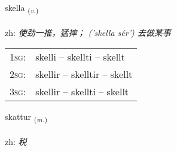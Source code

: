 \documentclass[frontgrid, backgrid]{flacards}\usepackage[]{graphicx}\usepackage[]{color}
\begin{document}
\renewcommand{\flhead}{\vskip5pt \fboxsep=0pt {\small\bfseries\footnotesize Sagnorð | 动词}}
\renewcommand{\fcfoot}{\vskip5pt \fboxsep=0pt \hspace{2pt}{\small\bfseries\footnotesize 2K}}

\renewcommand{\blhead}{\vskip5pt {\small\bfseries\footnotesize Sagnorð | 动词 }}
\renewcommand{\bcfoot}{\vskip5pt \hspace{2pt}{\small\bfseries\footnotesize 2K}}


{skella \small{\textsubscript{(\textit{v.})}} \\[1ex] %
\textphonetic{[scɛtla]} \\
zh: \emph{使劲一推，猛摔； ('skella sér') 去做某事} \\  [2ex]
\renewcommand*{\arraystretch}{0.8}
\begin{tabular}{p{1cm}l}
\textsc{1sg}: & skelli -- skellti -- skellt \\ 
\textsc{2sg}: & skellir -- skelltir -- skellt \\ 
\textsc{3sg}: & skellir -- skellti -- skellt \\ 
\end{tabular}
}

\renewcommand{\flhead}{\vskip5pt \fboxsep=0pt {\small\bfseries\footnotesize Nafnorð | 名词}}
\renewcommand{\fcfoot}{\vskip5pt \fboxsep=0pt \hspace{2pt}{\small\bfseries\footnotesize 2K}}

\renewcommand{\blhead}{\vskip5pt {\small\bfseries\footnotesize Nafnorð | 名词 }}
\renewcommand{\bcfoot}{\vskip5pt \hspace{2pt}{\small\bfseries\footnotesize 2K}}


{skattur \small{\textsubscript{(\textit{m.})}} \\[1ex] %
\textphonetic{[skahtʏr]} \\
zh: \emph{税} \\  [2ex]
\renewcommand*{\arraystretch}{0.8}
}
\end{document}
